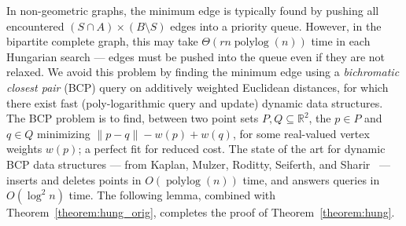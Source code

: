 \documentclass[11pt]{article}
\def\polylog{\mathop{\mathrm{polylog}}}
\theoremstyle{plain}
\begin{document}
In non-geometric graphs, the minimum edge is typically found by pushing all 
encountered $(S \cap A) \times (B \setminus S)$ edges into a priority queue.
However, in the bipartite complete graph, this may take $\Theta(rn\polylog(n))$
time in each Hungarian search --- edges must be pushed into the queue even if 
they are not relaxed.
We avoid this problem by finding the minimum edge using a \emph{bichromatic 
closest pair} (BCP) query on additively weighted Euclidean distances,
for which there exist fast (poly-logarithmic query and update) dynamic data 
structures.
The BCP problem is to find, between two point sets 
$P, Q \subseteq \mathbb{R}^2$, the $p \in P$ and $q \in Q$ minimizing 
$\|p - q\| - w(p) + w(q)$, for some real-valued vertex weights $w(p)$;
a perfect fit for reduced cost.
The state of the art for dynamic BCP data structures --- from Kaplan, Mulzer, 
Roditty, Seiferth, and Sharir~\cite{KMRSS17} --- inserts and deletes points in 
$O(\polylog(n))$ time, and answers queries in $O(\log^2 n)$ time.
The following lemma, combined with Theorem~\ref{theorem:hung_orig}, completes
the proof of Theorem~\ref{theorem:hung}.
\end{document}
